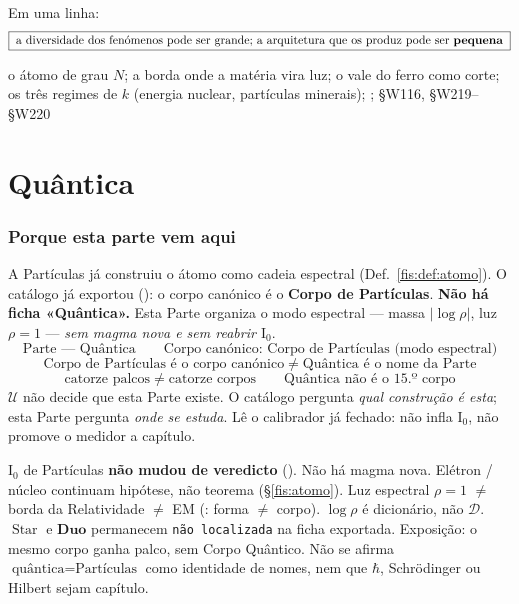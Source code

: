 \documentclass[livro.tex]{subfiles}
\begin{document}
\medskip\noindent Em uma linha:
\[
\boxed{\;\text{a diversidade dos fenómenos pode ser grande;
a arquitetura que os produz pode ser \textbf{pequena}}\;}
\]

        {o átomo de grau $N$; a borda onde a matéria vira luz; o vale do ferro como corte; os três regimes de $k$}
        { (energia nuclear, partículas minerais); ;  §W116, §W219--§W220}

\part{Quântica}

\section{Porque esta parte vem aqui}\label{fis:quantica}

\noindent A Partículas já construiu o átomo como cadeia espectral
(Def.~\ref{fis:def:atomo}). O catálogo já exportou
(): o corpo canónico é o
\textbf{Corpo de Partículas}. \textbf{Não há ficha «Quântica».}
Esta Parte organiza o modo espectral --- massa
\(\lvert\log\rho\rvert\), luz \(\rho=1\) --- \emph{sem magma nova e
sem reabrir \(\mathrm{I}_{0}\)}.
\[
\boxed{\;
\text{Parte --- Quântica}
\qquad
\text{Corpo canónico: Corpo de Partículas (modo espectral)}
\;}
\]
\[
\boxed{\;
\text{Corpo de Partículas é o corpo canónico}
\;\neq\;
\text{Quântica é o nome da Parte}
\;}
\]
\[
\boxed{\;
\text{catorze palcos}
\;\neq\;
\text{catorze corpos}
\qquad
\text{Quântica não é o 15.º corpo}
\;}
\]
\(\mathcal{U}\) não decide que esta Parte existe. O catálogo pergunta
\emph{qual construção é esta}; esta Parte pergunta \emph{onde se
estuda}. Lê o calibrador já fechado: não infla \(\mathrm{I}_{0}\), não
promove o medidor a capítulo.

\begin{observacao}\label{fis:obs:quantica-i0}
\(\mathrm{I}_{0}\) de Partículas \textbf{não mudou de veredicto}
(). Não há magma nova. Elétron /
núcleo continuam hipótese, não teorema (§\ref{fis:atomo}). Luz
espectral \(\rho=1\) \(\neq\) borda da Relatividade \(\neq\) EM
(: forma \(\neq\) corpo). \(\log\rho\) é
dicionário, não \(\mathcal{D}\). \(\operatorname{Star}\) e
\(\mathbf{Duo}\) permanecem \texttt{não localizada} na ficha
exportada. Exposição: o mesmo corpo ganha palco, sem Corpo Quântico.
Não se afirma \(\text{quântica}=\text{Partículas}\) como identidade de
nomes, nem que \(\hbar\), Schrödinger ou Hilbert sejam capítulo.
\end{observacao}
\end{document}
